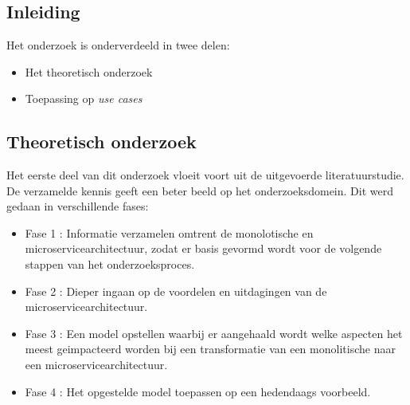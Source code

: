 
\chapter{}
\label{ch:methodologie}


\section{Inleiding}

Het onderzoek is onderverdeeld in twee delen:
\begin{itemize}
    \item Het theoretisch onderzoek
    \item Toepassing op \emph{use cases} 
\end{itemize}

\section{Theoretisch onderzoek}

Het eerste deel van dit onderzoek vloeit voort uit de uitgevoerde literatuurstudie. De verzamelde kennis geeft een beter beeld op het onderzoeksdomein. Dit werd gedaan in verschillende fases:

\begin{itemize}
    \item Fase 1 : Informatie verzamelen omtrent de monolotische en microservicearchitectuur, zodat er basis gevormd wordt voor de volgende stappen van het onderzoeksproces. 
    \item Fase 2 : Dieper ingaan op de voordelen en uitdagingen van de microservicearchitectuur.
    \item Fase 3 : Een model opstellen waarbij er aangehaald wordt welke aspecten het meest geimpacteerd worden bij een transformatie van een monolitische naar een microservicearchitectuur.
    \item Fase 4 : Het opgestelde model toepassen op een hedendaags voorbeeld.
\end{itemize}


